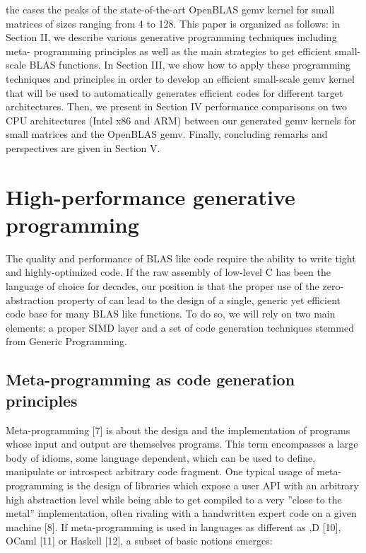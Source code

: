 \documentclass[../../main.tex]{subfiles}
\begin{document}
the cases the peaks of the state-of-the-art OpenBLAS gemv
kernel for small matrices of sizes ranging from 4 to 128.
This paper is organized as follows: in Section II, we describe
various generative programming techniques including meta-
programming principles as well as the main strategies to get
efficient small-scale BLAS functions. In Section III, we show
how to apply these programming techniques and principles
in order to develop an efficient small-scale gemv kernel that
will be used to automatically generates efficient \cpp codes for
different target architectures. Then, we present in Section IV
performance comparisons on two CPU architectures (Intel
x86 and ARM) between our generated gemv kernels for
small matrices and the OpenBLAS gemv. Finally, concluding
remarks and perspectives are given in Section V.

\section{High-performance generative programming}

The quality and performance of BLAS like code require
the ability to write tight and highly-optimized code. If the
raw assembly of low-level C has been the language of choice
for decades, our position is that the proper use of the zero-
abstraction property of \cpp can lead to the design of a single,
generic yet efficient code base for many BLAS like functions.
To do so, we will rely on two main elements: a proper \cpp
SIMD layer and a set of code generation techniques stemmed
from Generic Programming.

\subsection{Meta-programming as code generation principles}

Meta-programming [7] is about the design and the
implementation of programs whose input and output
are themselves programs. This term encompasses a large
body of idioms, some language dependent, which can be used
to define, manipulate or introspect arbitrary code fragment.
One typical usage of meta-programming is the design of
libraries which expose a user API with an arbitrary high
abstraction level while being able to get compiled to a very
”close to the metal” implementation, often rivaling with a
handwritten expert code on a given machine [8].
If meta-programming is used in languages as different as
\cpp [9],D [10], OCaml [11] or Haskell [12], a subset of
basic notions emerges:
\end{document}

